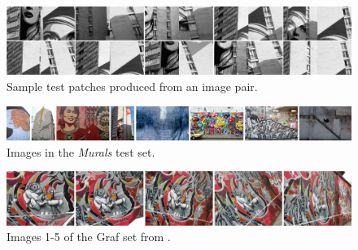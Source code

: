 \documentclass{article}
\begin{document}
\begin{figure}[htb]
			\centering
			\includegraphics[width=\columnwidth]{images/crop_examples}
	\caption{Sample test patches produced from an image pair.}
	\label{fig:fairey}
\end{figure}

\begin{figure}[t]
	\centering
	\includegraphics[width=\textwidth]{images/murals}
	\caption{Images in the \emph{Murals} test set.}
	\label{fig:murals}
\end{figure}

\begin{figure}[htb]
	\centering
	\includegraphics[width=\columnwidth]{images/graf12345.jpg}
	\caption{Images 1-5 of the Graf set from \cite{mikolajczyk2005performance}.}
	\label{fig:Graf}
\end{figure}


\end{document}
